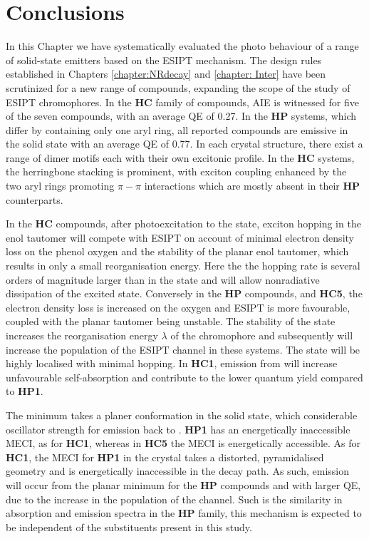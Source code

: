 \section{Conclusions}\label{section: Connecting_Conclusions}
In this Chapter we have systematically evaluated the photo behaviour of a range of solid-state emitters based on the ESIPT mechanism. The design rules established in Chapters \ref{chapter:NRdecay} and \ref{chapter: Inter} have been scrutinized for a new range of compounds, expanding the scope of the study of ESIPT chromophores. In the \textbf{HC} family of compounds, AIE is witnessed for five of the seven compounds, with an average QE of 0.27. In the \textbf{HP} systems, which differ by containing only one aryl ring, all reported compounds are emissive in the solid state with an average QE of 0.77. In each crystal structure, there exist a range of dimer motifs each with their own excitonic profile. In the \textbf{HC} systems, the herringbone stacking is prominent, with exciton coupling enhanced by the two aryl rings promoting $\pi-\pi$ interactions which are mostly absent in their \textbf{HP} counterparts.  

In the \textbf{HC} compounds, after photoexcitation to the \sone{} state, exciton hopping in the enol tautomer will compete with ESIPT on account of minimal electron density loss on the phenol oxygen and the stability of the planar enol tautomer, which results in only a small reorganisation energy. Here the the hopping rate is several orders of magnitude larger than in the \Kstar{} state and will allow nonradiative dissipation of the excited state. Conversely in the \textbf{HP} compounds, and \textbf{HC5}, the electron density loss is increased on the oxygen and ESIPT is more favourable, coupled with the planar \Estar{} tautomer being unstable. The stability of the \Kstar{} state increases the reorganisation energy $\lambda$ of the chromophore and subsequently will increase the population of the ESIPT channel in these systems. The \Kstar{} state will be highly localised with minimal hopping. In \textbf{HC1}, emission from \Estar{} will increase unfavourable self-absorption and contribute to the lower quantum yield compared to \textbf{HP1}.

The \Kstar{} minimum takes a planer conformation in the solid state, which considerable oscillator strength for emission back to \szero{}. \textbf{HP1} has an energetically inaccessible MECI, as for \textbf{HC1}, whereas in \textbf{HC5} the MECI is energetically accessible. As for \textbf{HC1}, the MECI for \textbf{HP1} in the crystal takes a distorted, pyramidalised geometry and is energetically inaccessible in the decay path. As such, emission will occur from the planar \Kstar{} minimum for the \textbf{HP} compounds and with larger QE, due to the increase in the population of the \Kstar{} channel. Such is the similarity in absorption and emission spectra in the \textbf{HP} family, this mechanism is expected to be independent of the substituents present in this study. 

